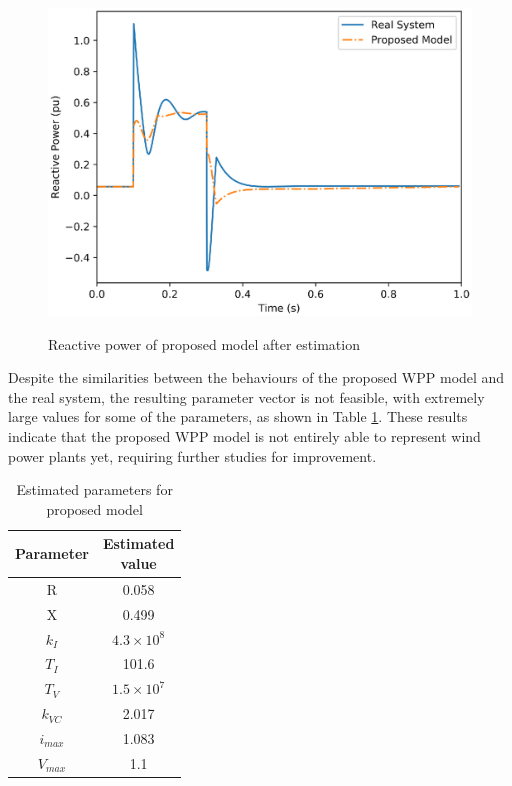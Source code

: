 \begin{figure}[!h]
	\centering
	\caption{Reactive power of proposed model after estimation}
	\includegraphics[scale=.7]{Images/Q_proposed_estimated.eps}
	\label{fig: estimation_proposed_Q}
\end{figure}

Despite the similarities between the behaviours of the proposed WPP model and the real system, the resulting parameter vector is not feasible, with extremely large values for some of the parameters, as shown in Table \ref{tab: results_proposed}. These results indicate that the proposed WPP model is not entirely able to represent wind power plants yet, requiring further studies for improvement.


\begin{table}[h]
	\centering
	\caption{Estimated parameters for proposed model}
	\begin{tabular}{c|c}
		Parameter & \shortstack{Estimated \\ value} \\\hline
		R & 0.058 \\
		X & 0.499 \\
		$k_{I}$ & $4.3\times 10^{8}$ \\
		$T_{I}$ & 101.6 \\
		$T_{V}$ & $1.5\times 10^{7}$ \\
		$k_{VC}$ & 2.017 \\
		$i_{max}$ & 1.083 \\
		$V_{max}$ & 1.1
	\end{tabular}
	\label{tab: results_proposed}
\end{table}